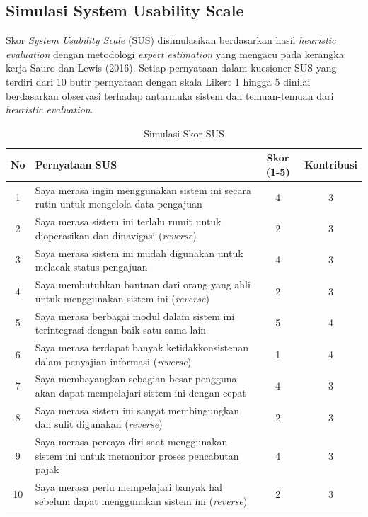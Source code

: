 \documentclass[conference]{IEEEtran}
\begin{document}
\subsection{Simulasi System Usability Scale}
\label{subsec:sus}

Skor \emph{System Usability Scale} (SUS) disimulasikan berdasarkan hasil \emph{heuristic
evaluation} dengan metodologi \emph{expert estimation} yang mengacu pada kerangka kerja
Sauro dan Lewis (2016). Setiap pernyataan dalam kuesioner SUS yang terdiri dari 10 butir
pernyataan dengan skala Likert 1 hingga 5 dinilai berdasarkan observasi terhadap antarmuka
sistem dan temuan-temuan dari \emph{heuristic evaluation}.

\begin{table}[!t]
\centering
\caption{Simulasi Skor SUS}
\label{tab:sus-scores}
\renewcommand{\arraystretch}{1.3}
\begin{tabular}{|c|l|c|c|}
\hline
\textbf{No} & \textbf{Pernyataan SUS} & \textbf{Skor (1-5)} & \textbf{Kontribusi} \\
\hline
1 & Saya merasa ingin menggunakan sistem ini secara rutin untuk mengelola data pengajuan & 4 & 3 \\
2 & Saya merasa sistem ini terlalu rumit untuk dioperasikan dan dinavigasi (\emph{reverse}) & 2 & 3 \\
3 & Saya merasa sistem ini mudah digunakan untuk melacak status pengajuan & 4 & 3 \\
4 & Saya membutuhkan bantuan dari orang yang ahli untuk menggunakan sistem ini (\emph{reverse}) & 2 & 3 \\
5 & Saya merasa berbagai modul dalam sistem ini terintegrasi dengan baik satu sama lain & 5 & 4 \\
6 & Saya merasa terdapat banyak ketidakkonsistenan dalam penyajian informasi (\emph{reverse}) & 1 & 4 \\
7 & Saya membayangkan sebagian besar pengguna akan dapat mempelajari sistem ini dengan cepat & 4 & 3 \\
8 & Saya merasa sistem ini sangat membingungkan dan sulit digunakan (\emph{reverse}) & 2 & 3 \\
9 & Saya merasa percaya diri saat menggunakan sistem ini untuk memonitor proses pencabutan pajak & 4 & 3 \\
10 & Saya merasa perlu mempelajari banyak hal sebelum dapat menggunakan sistem ini (\emph{reverse}) & 2 & 3 \\
\hline
\end{tabular}
\end{table}
\end{document}
